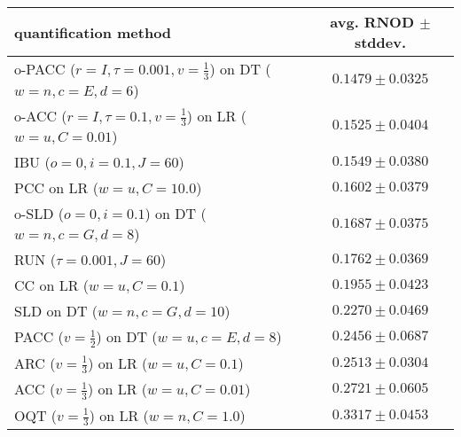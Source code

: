 \begin{tabular}{lc}
  \toprule
  quantification method & avg. RNOD $\pm$ stddev. \\
  \midrule
  o-PACC ($r=I, \tau=0.001, v=\frac{1}{3}$) on DT ($w=n, c=E, d=6$) & $\mathbf{0.1479 \pm 0.0325}$ \\
  o-ACC ($r=I, \tau=0.1, v=\frac{1}{3}$) on LR ($w=u, C=0.01$) & $0.1525 \pm 0.0404$ \\
  IBU ($o=0, i=0.1, J=60$) & $0.1549 \pm 0.0380$ \\
  PCC on LR ($w=u, C=10.0$) & $0.1602 \pm 0.0379$ \\
  o-SLD ($o=0, i=0.1$) on DT ($w=n, c=G, d=8$) & $0.1687 \pm 0.0375$ \\
  RUN ($\tau=0.001, J=60$) & $0.1762 \pm 0.0369$ \\
  CC on LR ($w=u, C=0.1$) & $0.1955 \pm 0.0423$ \\
  SLD on DT ($w=n, c=G, d=10$) & $0.2270 \pm 0.0469$ \\
  PACC ($v=\frac{1}{2}$) on DT ($w=u, c=E, d=8$) & $0.2456 \pm 0.0687$ \\
  ARC ($v=\frac{1}{3}$) on LR ($w=u, C=0.1$) & $0.2513 \pm 0.0304$ \\
  ACC ($v=\frac{1}{3}$) on LR ($w=u, C=0.01$) & $0.2721 \pm 0.0605$ \\
  OQT ($v=\frac{1}{3}$) on LR ($w=n, C=1.0$) & $0.3317 \pm 0.0453$ \\
  \bottomrule
\end{tabular}
